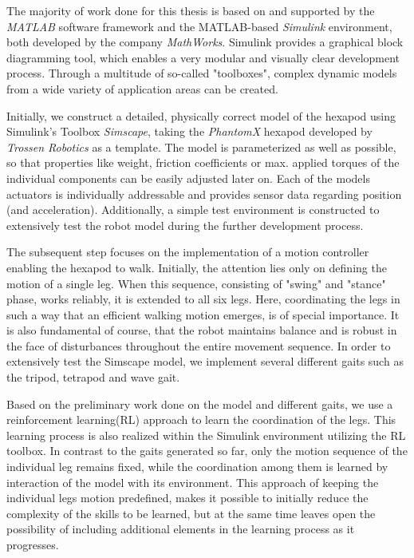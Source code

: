 The majority of work done for this thesis is based on and supported by the \textit{MATLAB\textsuperscript{\textregistered}} software framework and the MATLAB-based \textit{Simulink\textsuperscript{\textregistered}} environment, both developed by the company \textit{MathWorks\textsuperscript{\textregistered}}.
Simulink provides a graphical block diagramming tool, which enables a very modular and visually clear development process.
Through a multitude of so-called "toolboxes", complex dynamic models from a wide variety of application areas can be created.

Initially, we construct a detailed, physically correct model of the hexapod using Simulink's Toolbox \textit{Simscape\textsuperscript{\texttrademark}}, taking the \emph{PhantomX} hexapod developed by \emph{Trossen Robotics} as a template.
The model is parameterized as well as possible, so that properties like weight, friction coefficients or max. applied torques of the individual components can be easily adjusted later on.
Each of the models actuators is individually addressable and provides sensor data regarding position (and acceleration).
Additionally, a simple test environment is constructed to extensively test the robot model during the further development process.

The subsequent step focuses on the implementation of a motion controller enabling the hexapod to walk.
Initially, the attention lies only on defining the motion of a single leg.
When this sequence, consisting of "swing" and "stance" phase, works reliably, it is extended to all six legs.
Here, coordinating the legs in such a way that an efficient walking motion emerges, is of special importance.
It is also fundamental of course, that the robot maintains balance and is robust in the face of disturbances throughout the entire movement sequence.
In order to extensively test the Simscape model, we implement several different gaits such as the tripod, tetrapod and wave gait.

Based on the preliminary work done on the model and different gaits, we use a reinforcement learning(RL) approach to learn the coordination of the legs.
This learning process is also realized within the Simulink environment utilizing the RL toolbox.
In contrast to the gaits generated so far, only the motion sequence of the individual leg remains fixed, while the coordination among them is learned by interaction of the model with its environment. 
This approach of keeping the individual legs motion predefined, makes it possible to initially reduce the complexity of the skills to be learned, but at the same time leaves open the possibility of including additional elements in the learning process as it progresses.

